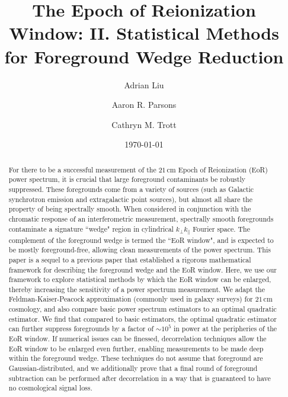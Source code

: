 \documentclass[twocolumn,aps,prd,nofootinbib,showpacs]{revtex4-1}
\begin{document}
\title{The Epoch of Reionization Window: II. Statistical Methods for Foreground Wedge Reduction}

\author{Adrian Liu}
\author{Aaron R. Parsons}
\author{Cathryn M. Trott}
\date{\today}

\newcommand{\apjs}{Astrophys. J. Suppl. Ser.}
\newcommand{\aj}{Astron. J.}
\newcommand{\mnras}{Mon. Not. R. Astron. Soc.}
\newcommand{\apjl}{Astrophys. J. Lett.}
\newcommand{\aap}{Astron. Astrophys.}
\newcommand{\pasa}{PASA}
\newcommand{\physrep}{Phys. Rep.}
\newcommand{\araa}{Annu. Rev. Astron. Astrophys.}




\begin{abstract}
For there to be a successful measurement of the $21\,\textrm{cm}$ Epoch of Reionization (EoR) power spectrum, it is crucial that large foreground contaminants be robustly suppressed.  These foregrounds come from a variety of sources (such as Galactic synchrotron emission and extragalactic point sources), but almost all share the property of being spectrally smooth.  When considered in conjunction with the chromatic response of an interferometric measurement, spectrally smooth foregrounds contaminate a signature ``wedge" region in cylindrical $k_\perp k_\parallel$ Fourier space.  The complement of the foreground wedge is termed the ``EoR window", and is expected to be mostly foreground-free, allowing clean measurements of the power spectrum.  This paper is a sequel to a previous paper that established a rigorous mathematical framework for describing the foreground wedge and the EoR window.  Here, we use our framework to explore statistical methods by which the EoR window can be enlarged, thereby increasing the sensitivity of a power spectrum measurement.  We adapt the Feldman-Kaiser-Peacock approximation (commonly used in galaxy surveys) for $21\,\textrm{cm}$ cosmology, and also compare basic power spectrum estimators to an optimal quadratic estimator.  We find that compared to basic estimators, the optimal quadratic estimator can further suppress foregrounds by a factor of $\sim 10^5$ in power at the peripheries of the EoR window.  If numerical issues can be finessed, decorrelation techniques allow the EoR window to be enlarged even further, enabling measurements to be made deep within the foreground wedge.  These techniques do not assume that foreground are Gaussian-distributed, and we additionally prove that a final round of foreground subtraction can be performed after decorrelation in a way that is guaranteed to have no cosmological signal loss.
\end{abstract}
\end{document}

